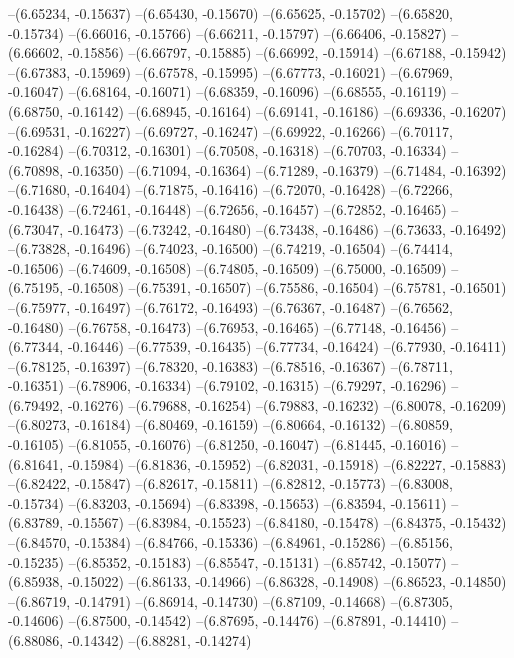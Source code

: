 --(6.65234, -0.15637)
--(6.65430, -0.15670)
--(6.65625, -0.15702)
--(6.65820, -0.15734)
--(6.66016, -0.15766)
--(6.66211, -0.15797)
--(6.66406, -0.15827)
--(6.66602, -0.15856)
--(6.66797, -0.15885)
--(6.66992, -0.15914)
--(6.67188, -0.15942)
--(6.67383, -0.15969)
--(6.67578, -0.15995)
--(6.67773, -0.16021)
--(6.67969, -0.16047)
--(6.68164, -0.16071)
--(6.68359, -0.16096)
--(6.68555, -0.16119)
--(6.68750, -0.16142)
--(6.68945, -0.16164)
--(6.69141, -0.16186)
--(6.69336, -0.16207)
--(6.69531, -0.16227)
--(6.69727, -0.16247)
--(6.69922, -0.16266)
--(6.70117, -0.16284)
--(6.70312, -0.16301)
--(6.70508, -0.16318)
--(6.70703, -0.16334)
--(6.70898, -0.16350)
--(6.71094, -0.16364)
--(6.71289, -0.16379)
--(6.71484, -0.16392)
--(6.71680, -0.16404)
--(6.71875, -0.16416)
--(6.72070, -0.16428)
--(6.72266, -0.16438)
--(6.72461, -0.16448)
--(6.72656, -0.16457)
--(6.72852, -0.16465)
--(6.73047, -0.16473)
--(6.73242, -0.16480)
--(6.73438, -0.16486)
--(6.73633, -0.16492)
--(6.73828, -0.16496)
--(6.74023, -0.16500)
--(6.74219, -0.16504)
--(6.74414, -0.16506)
--(6.74609, -0.16508)
--(6.74805, -0.16509)
--(6.75000, -0.16509)
--(6.75195, -0.16508)
--(6.75391, -0.16507)
--(6.75586, -0.16504)
--(6.75781, -0.16501)
--(6.75977, -0.16497)
--(6.76172, -0.16493)
--(6.76367, -0.16487)
--(6.76562, -0.16480)
--(6.76758, -0.16473)
--(6.76953, -0.16465)
--(6.77148, -0.16456)
--(6.77344, -0.16446)
--(6.77539, -0.16435)
--(6.77734, -0.16424)
--(6.77930, -0.16411)
--(6.78125, -0.16397)
--(6.78320, -0.16383)
--(6.78516, -0.16367)
--(6.78711, -0.16351)
--(6.78906, -0.16334)
--(6.79102, -0.16315)
--(6.79297, -0.16296)
--(6.79492, -0.16276)
--(6.79688, -0.16254)
--(6.79883, -0.16232)
--(6.80078, -0.16209)
--(6.80273, -0.16184)
--(6.80469, -0.16159)
--(6.80664, -0.16132)
--(6.80859, -0.16105)
--(6.81055, -0.16076)
--(6.81250, -0.16047)
--(6.81445, -0.16016)
--(6.81641, -0.15984)
--(6.81836, -0.15952)
--(6.82031, -0.15918)
--(6.82227, -0.15883)
--(6.82422, -0.15847)
--(6.82617, -0.15811)
--(6.82812, -0.15773)
--(6.83008, -0.15734)
--(6.83203, -0.15694)
--(6.83398, -0.15653)
--(6.83594, -0.15611)
--(6.83789, -0.15567)
--(6.83984, -0.15523)
--(6.84180, -0.15478)
--(6.84375, -0.15432)
--(6.84570, -0.15384)
--(6.84766, -0.15336)
--(6.84961, -0.15286)
--(6.85156, -0.15235)
--(6.85352, -0.15183)
--(6.85547, -0.15131)
--(6.85742, -0.15077)
--(6.85938, -0.15022)
--(6.86133, -0.14966)
--(6.86328, -0.14908)
--(6.86523, -0.14850)
--(6.86719, -0.14791)
--(6.86914, -0.14730)
--(6.87109, -0.14668)
--(6.87305, -0.14606)
--(6.87500, -0.14542)
--(6.87695, -0.14476)
--(6.87891, -0.14410)
--(6.88086, -0.14342)
--(6.88281, -0.14274)
